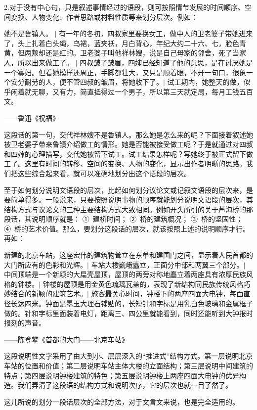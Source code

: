 2.对于没有中心句，只是叙述事情经过的语段，则可按照情节发展的时间顺序、空间变换、人物变化、作者思路或材料性质等来划分层次。例如：

她不是鲁镇人。 $\vert$ 有一年的冬初，四叔家里要换女工，做中人的卫老婆子带她进来了，头上扎着白头绳，乌裙，蓝夹袄，月白背心，年纪大约二十六、七，脸色青黄，但两颊却还是红的。卫老婆子叫他祥林嫂，说是自己母家的邻舍，死了当家人，所以出来做工了。 $\vert$ 四叔皱了皱眉，四婶已经知道了他的意思，是在讨厌她是一个寡妇。但看她模样还周正，手脚都壮大，又只是顺着眼，不开一句口，很象一个安分耐劳的人，便不管四叔的皱眉，将她收下了。$\vert$ 试工期内，她整天的做，似乎闲着就无聊，又有力，简直抵得过一个男子，所以第三天就定局，每月工钱五百文。
\begin{flushright}
——鲁迅《祝福》
\end{flushright}

这段话的第一句，交代祥林嫂不是鲁镇人。那么她是怎么来的呢？下面接着叙述她被卫老婆子带来鲁镇介绍做工的情形。她是否能被接受做工呢？于是就通过对四叔和四婶的心理描写，交代她被留下试工。试工结果怎样呢？写她终于被正式留下做工了。这里有时间的转移、空间的变换、人物的变化，显示出作者明晰的思路。我们把这些综合起来看，就可以准确地划分出这个语段的层次。

至于如何划分说明文语段的层次，比起如何划分议论文或记叙文语段的层次来，是要简单得多。一般说来，只要按照说明事物的顺序就能划分说明文语段的层次，其结构方式与议论文的三种主要结构方式大致相同。例如开头所引的关于芦沟桥的那段话，其说明顺序就是：
①\ 建桥时间；
②\ 桥的建筑概况；
③\ 桥的坚固性；
④\ 桥的艺术价值。那么，要划分这段话的层次，就该按照上述的说明顺序才行。再如：

新建的北京车站，这座宏伟的建筑物耸立在东单和建国门之间，显示着人民首都的大门所应有的色彩和光辉。$\vert$ 车站大楼巍峨矗立，正面分中部和两翼三个部分。$\vert$ 中间顶端是一个新颖的大扁壳屋顶，屋顶的两旁对称地矗立着两座具有浓厚民族风格的钟楼。$\vert$ 钟楼的屋顶是用金黄色琉璃瓦盖的，表现了新结构同民族传统风格巧妙结合的新颖的建筑艺术。$\vert$ 旅客最关心时间，钟楼下的两座四面大电钟，每面直径长达四米。钟面是墨玉大理石铺贴的，长短针和字标是用乳白色玻璃和金属框子做的。针和字标里面装着电灯，距离三、四公里就能看到，同时还能听到大钟报时报刻的声音。
\begin{flushright}
——陈登攀《首都的大门——北京车站》
\end{flushright}

这段说明性文字采用了由大到小、层层深入的“推进式”结构方式。第一层说明北京车站的位置和价值；第二层说明车站主体大楼的立面结构；第三层说明中间建筑的特点；第四层说明钟楼建筑的特色；第五层说明钟楼上两座四面大电钟的优异构造。我们弄清了这段语的结构方式和说明次序，它的层次也就一目了然了。

这儿所说的划分一段话层次的全部方法，对于文言文来说，也是完全适用的。
\newpage